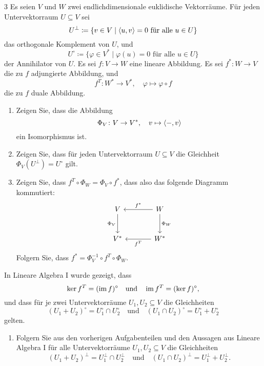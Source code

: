 \begin{question}[subtitle = Zusammenhang zwischen Skalarproduktraum und Dualraum]{3}
  Es seien $V$ und $W$ zwei endlichdimensionale euklidische Vektorräume.
  Für jeden Untervektorraum $U \subseteq V$ sei
  \[
              U^\perp
    \coloneqq \{ v \in V \mid \text{$\left\langle u, v \right\rangle = 0$ für alle $u \in U$} \}
  \]
  das orthogonale Komplement von $U$, und
  \[
              U^\circ
    \coloneqq \{ \varphi \in V^* \mid \text{$\varphi(u) = 0$ für alle $u \in U$} \}
  \]
  der Annihilator von $U$.
  Es sei $f \colon V \to W$ eine lineare Abbildung.
  Es sei $f^* \colon W \to V$ die zu $f$ adjungierte Abbildung, und
  \[
    f^T \colon W^* \to V^*,
    \quad
    \varphi \mapsto \varphi \circ f
  \]
  die zu $f$ duale Abbildung.
  \begin{enumerate}[leftmargin=*]
    \item
      Zeigen Sie, dass die Abbildung
      \[
        \Phi_V \colon V \to V^*,
        \quad
        v \mapsto \left\langle -, v \right\rangle
      \]
      ein Isomorphismus ist.
    \item
      Zeigen Sie, dass für jeden Untervektorraum $U \subseteq V$ die Gleichheit $\Phi_V(U^\perp) = U^\circ$ gilt.
    \item
      Zeigen Sie, dass $f^T \circ \Phi_W = \Phi_V \circ f^*$, dass also das folgende Diagramm kommutiert:
      \[
        \begin{tikzcd}[row sep = large, column sep = large, ampersand replacement = \&]
                V   \arrow[swap]{d}{\Phi_V}
            \&  W   \arrow[swap]{l}{f^*}
                    \arrow{d}{\Phi_W}
          \\
                V^* 
            \&  W^* \arrow{l}{f^T}
        \end{tikzcd}
      \]
      Folgern Sie, dass $f^* = \Phi_V^{-1} \circ f^T \circ \Phi_W$.
  \end{enumerate}
  In Lineare Algebra I wurde gezeigt, dass
  \[
      \ker f^T
    = (\operatorname{im} f)^\circ
    \quad\text{und}\quad
      \operatorname{im} f^T
    = (\ker f )^\circ,
  \]
  und dass für je zwei Untervektorräume $U_1, U_2 \subseteq V$ die Gleichheiten
  \[
      (U_1 + U_2)^\circ
    = U_1^\circ \cap U_2^\circ
    \quad\text{und}\quad
      (U_1 \cap U_2)^\circ
    = U_1^\circ + U_2^\circ
  \]
  gelten.
  \begin{enumerate}[leftmargin=*, resume]
    \item
      Folgern Sie aus den vorherigen Aufgabenteilen und den Aussagen aus Lineare Algebra I für alle Untervektorräume $U_1, U_2 \subseteq V$ die Gleichheiten
      \[
          (U_1 + U_2)^\perp
        = U_1^\perp \cap U_2^\perp
        \quad\text{und}\quad
          (U_1 \cap U_2)^\perp
        = U_1^\perp + U_2^\perp.
      \]
      

\end{enumerate}
\end{question}
